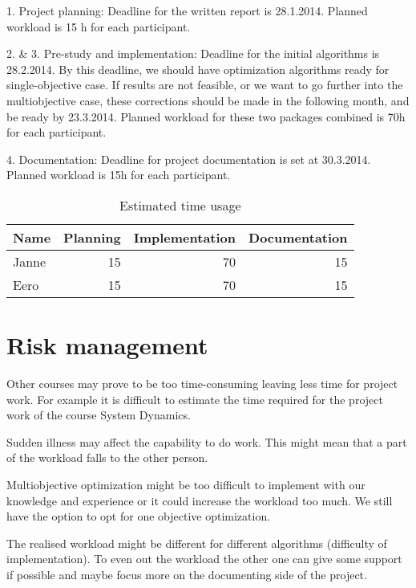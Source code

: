 \documentclass[twoside]{article}
\begin{document}
\begin{multicols}{2}
1. Project planning:
Deadline for the written report is 28.1.2014. Planned workload is 15 h for each participant.

2. \& 3. Pre-study and implementation:
Deadline for the initial algorithms is 28.2.2014. By this deadline, we should have optimization algorithms ready for single-objective case. If results are not feasible, or we want to go further into the multiobjective case, these corrections should be made in the following month, and be ready by 23.3.2014. Planned workload for these two packages combined is 70h for each participant.

4. Documentation:
Deadline for project documentation is set at 30.3.2014. Planned workload is 15h for each participant.



\begin{table*}[t]
\caption{Estimated time usage}
\centering
\begin{tabular}{lrrr}
\toprule
Name & Planning & Implementation & Documentation \\
\midrule
Janne & 15 & 70 & 15 \\
Eero & 15 & 70 & 15 \\
\bottomrule
\end{tabular}
\end{table*}




\section{Risk management}
Other courses may prove to be too time-consuming leaving less time for project work. For example it is difficult to estimate the time required for the project work of the course System Dynamics.

Sudden illness may affect the capability to do work. This might mean that a part of the workload falls to the other person.

Multiobjective optimization might be too difficult to implement with our knowledge and experience or it could increase the workload too much. We still have the option to opt for one objective optimization.

The realised workload might be different for different algorithms (difficulty of implementation). To even out the workload the other one can give some support if possible and maybe focus more on the documenting side of the project.


\end{multicols}
\end{document}
